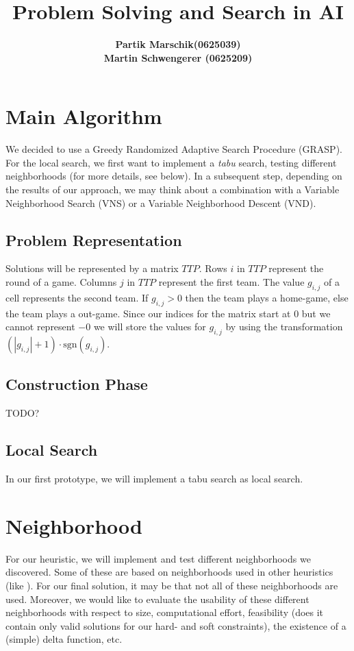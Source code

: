 \documentclass[a4paper,11pt]{article}
\title{ \LARGE \bf Problem Solving and Search in AI }
\author{
\bf Partik Marschik(0625039) \\
\bf Martin Schwengerer (0625209) }
\begin{document}
\maketitle

\section{Main Algorithm}
We decided to use a Greedy Randomized Adaptive Search Procedure (GRASP). For the local search, we first want to implement a \emph{tabu} search, testing different neighborhoods (for more details, see below). In a subsequent step, depending on the results of our approach, we may think about a combination with a Variable Neighborhood Search (VNS) or a Variable Neighborhood Descent (VND).



\subsection{Problem Representation}
Solutions will be represented by a matrix $TTP$.
Rows $i$ in $TTP$ represent the round of a game.
Columns $j$ in $TTP$ represent the first team.
The value $g_{i,j}$ of a cell represents the second team.
If $g_{i,j} > 0$ then the team plays a home-game, else the team plays a out-game.
Since our indices for the matrix start at $0$ but we cannot represent $-0$ we will
store the values for $g_{i,j}$ by using the transformation
$(|g_{i,j}| + 1) \cdot \text{sgn}(g_{i,j})$.

\subsection{Construction Phase}
TODO?
\subsection{Local Search}
In our first prototype, we will implement a tabu search as local search.

\section{Neighborhood}
For our heuristic, we will implement and test different neighborhoods we discovered. Some of these are based on neighborhoods used in other heuristics (like \cite{Gaspero07,rvk2008}).
For our final solution, it may be that not all of these neighborhoods are used. Moreover, we would like to evaluate the usability of these different neighborhoods with respect to size, computational effort, feasibility (does it contain only valid solutions for our hard- and soft constraints), the existence of a (simple) delta function, etc.
\end{document}
